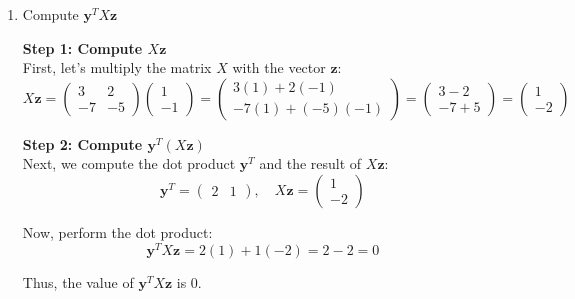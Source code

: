 \documentclass[letter]{article}
\theoremstyle{definition}
\newenvironment{soln}{
	\leavevmode\color{black}\ignorespaces
}{}
\begin{document}
	\begin{enumerate}
		\item 	Compute $\mathbf{y}^{T} X \mathbf{z}$\\
			
                \begin{soln}    
                    \textbf{Step 1: Compute $X \mathbf{z}$}\\
                    First, let's multiply the matrix $X$ with the vector $\mathbf{z}$:
                    \[
                    X \mathbf{z} = \begin{pmatrix} 3 & 2 \\ -7 & -5 \end{pmatrix} \begin{pmatrix} 1 \\ -1 \end{pmatrix}
                    = \begin{pmatrix} 3(1) + 2(-1) \\ -7(1) + (-5)(-1) \end{pmatrix}
                    = \begin{pmatrix} 3 - 2 \\ -7 + 5 \end{pmatrix}
                    = \begin{pmatrix} 1 \\ -2 \end{pmatrix}
                    \]
                    
                    \textbf{Step 2: Compute $\mathbf{y}^{T} (X \mathbf{z})$}\\
                    Next, we compute the dot product $\mathbf{y}^{T}$ and the result of $X \mathbf{z}$:
                    \[
                    \mathbf{y}^{T} = \begin{pmatrix} 2 & 1 \end{pmatrix}, \quad X \mathbf{z} = \begin{pmatrix} 1 \\ -2 \end{pmatrix}
                    \]
                    
                    Now, perform the dot product:
                    \[\mathbf{y}^{T} X \mathbf{z} = 2(1) + 1(-2) = 2 - 2 = 0\]
                    
                    Thus, the value of $\mathbf{y}^{T} X \mathbf{z}$ is 0.
                    
                \end{soln}


\end{enumerate}
\end{document}
